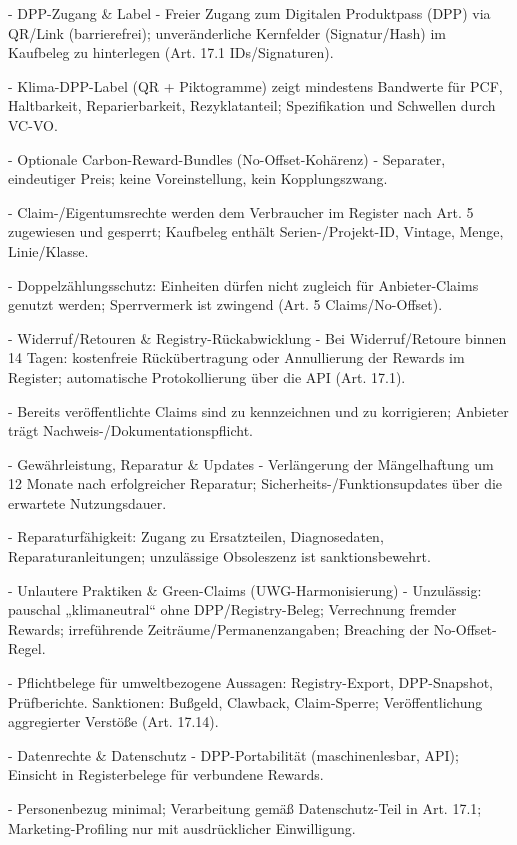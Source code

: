 \documentclass[12pt,a4paper]{scrartcl}
\begin{document}
- DPP-Zugang \& Label
- Freier Zugang zum Digitalen Produktpass (DPP) via QR/Link (barrierefrei); unveränderliche Kernfelder (Signatur/Hash) im Kaufbeleg zu hinterlegen (Art. 17.1 IDs/Signaturen).

- Klima-DPP-Label (QR + Piktogramme) zeigt mindestens Bandwerte für PCF, Haltbarkeit, Reparierbarkeit, Rezyklatanteil; Spezifikation und Schwellen durch VC-VO.

- Optionale Carbon-Reward-Bundles (No-Offset-Kohärenz)
- Separater, eindeutiger Preis; keine Voreinstellung, kein Kopplungszwang.

- Claim-/Eigentumsrechte werden dem Verbraucher im Register nach Art. 5 zugewiesen und gesperrt; Kaufbeleg enthält Serien-/Projekt-ID, Vintage, Menge, Linie/Klasse.

- Doppelzählungsschutz: Einheiten dürfen nicht zugleich für Anbieter-Claims genutzt werden; Sperrvermerk ist zwingend (Art. 5 Claims/No-Offset).

- Widerruf/Retouren \& Registry-Rückabwicklung
- Bei Widerruf/Retoure binnen 14 Tagen: kostenfreie Rückübertragung oder Annullierung der Rewards im Register; automatische Protokollierung über die API (Art. 17.1).

- Bereits veröffentlichte Claims sind zu kennzeichnen und zu korrigieren; Anbieter trägt Nachweis-/Dokumentationspflicht.

- Gewährleistung, Reparatur \& Updates
- Verlängerung der Mängelhaftung um 12 Monate nach erfolgreicher Reparatur; Sicherheits-/Funktionsupdates über die erwartete Nutzungsdauer.

- Reparaturfähigkeit: Zugang zu Ersatzteilen, Diagnosedaten, Reparaturanleitungen; unzulässige Obsoleszenz ist sanktionsbewehrt.

- Unlautere Praktiken \& Green-Claims (UWG-Harmonisierung)
- Unzulässig: pauschal „klimaneutral“ ohne DPP/Registry-Beleg; Verrechnung fremder Rewards; irreführende Zeiträume/Permanenzangaben; Breaching der No-Offset-Regel.

- Pflichtbelege für umweltbezogene Aussagen: Registry-Export, DPP-Snapshot, Prüfberichte. Sanktionen: Bußgeld, Clawback, Claim-Sperre; Veröffentlichung aggregierter Verstöße (Art. 17.14).

- Datenrechte \& Datenschutz
- DPP-Portabilität (maschinenlesbar, API); Einsicht in Registerbelege für verbundene Rewards.

- Personenbezug minimal; Verarbeitung gemäß Datenschutz-Teil in Art. 17.1; Marketing-Profiling nur mit ausdrücklicher Einwilligung.
\end{document}

